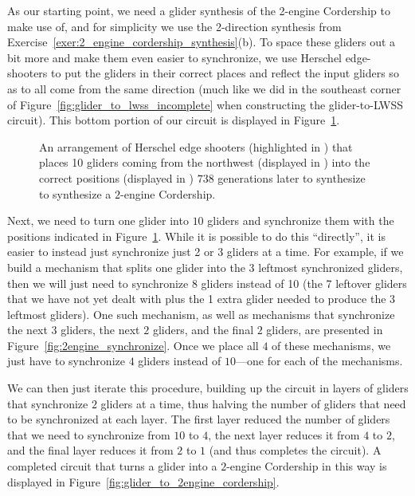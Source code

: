 As our starting point, we need a glider synthesis of the 2-engine Cordership to make use of, and for simplicity we use the 2-direction synthesis from Exercise~\ref{exer:2_engine_cordership_synthesis}(b). To space these gliders out a bit more and make them even easier to synchronize, we use Herschel edge-shooters to put the gliders in their correct places and reflect the input gliders so as to all come from the same direction (much like we did in the southeast corner of Figure~\ref{fig:glider_to_lwss_incomplete} when constructing the glider-to-LWSS circuit). This bottom portion of our circuit is displayed in Figure~\ref{fig:g_to_2engine_V}.

\begin{figure}[!htb]
	\centering
	\caption{An arrangement of Herschel edge shooters (highlighted in ) that places 10 gliders coming from the northwest (displayed in ) into the correct positions (displayed in ) $738$ generations later to synthesize to synthesize a $2$-engine Cordership.}\label{fig:g_to_2engine_V}
\end{figure}

Next, we need to turn one glider into $10$ gliders and synchronize them with the positions indicated in Figure~\ref{fig:g_to_2engine_V}. While it is possible to do this ``directly'', it is easier to instead just synchronize just 2 or 3 gliders at a time. For example, if we build a mechanism that splits one glider into the 3 leftmost synchronized gliders, then we will just need to synchronize 8 gliders instead of 10 (the 7 leftover gliders that we have not yet dealt with plus the 1 extra glider needed to produce the 3 leftmost gliders). One such mechanism, as well as mechanisms that synchronize the next $3$ gliders, the next $2$ gliders, and the final $2$ gliders, are presented in Figure~\ref{fig:2engine_synchronize}. Once we place all $4$ of these mechanisms, we just have to synchronize $4$ gliders instead of $10$---one for each of the mechanisms.

We can then just iterate this procedure, building up the circuit in layers of gliders that synchronize $2$ gliders at a time, thus halving the number of gliders that need to be synchronized at each layer. The first layer reduced the number of gliders that we need to synchronize from $10$ to $4$, the next layer reduces it from $4$ to $2$, and the final layer reduces it from $2$ to $1$ (and thus completes the circuit). A completed circuit that turns a glider into a $2$-engine Cordership in this way is displayed in Figure~\ref{fig:glider_to_2engine_cordership}.

